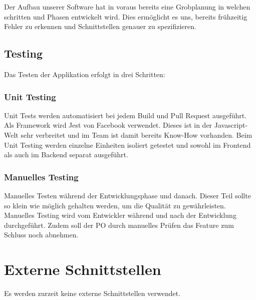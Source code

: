 \documentclass[a4paper, 11pt]{scrartcl}
\let\oldsection\section
\renewcommand\section{\clearpage\oldsection}
\begin{document}
Der Aufbau unserer Software hat in voraus bereits eine Grobplanung in welchen schritten und Phasen entwickelt wird.
Dies ermöglicht es uns, bereits frühzeitig Fehler zu erkennen und Schnittstellen genauer zu spezifizieren.

\subsection{Testing}
Das Testen der Applikation erfolgt in drei Schritten:

\subsubsection{Unit Testing}
Unit Tests werden automatisiert bei jedem Build und Pull Request ausgeführt.
Als Framework wird Jest von Facebook verwendet. Dieses ist in der Javascript-Welt sehr verbreitet und im Team ist damit bereits Know-How vorhanden.
Beim Unit Testing werden einzelne Einheiten isoliert getestet und sowohl im Frontend als auch im Backend separat ausgeführt.


\subsubsection{Manuelles Testing}
Manuelles Testen während der Entwicklungsphase und danach. Dieser Teil sollte so klein wie möglich gehalten werden, um die Qualität zu gewährleisten. Manuelles Testing wird vom Entwickler während und nach der Entwicklung durchgeführt.
Zudem soll der PO durch manuelles Prüfen das Feature zum Schluss noch abnehmen.

\section{Externe Schnittstellen}
Es werden zurzeit keine externe Schnittstellen verwendet.
\end{document}
